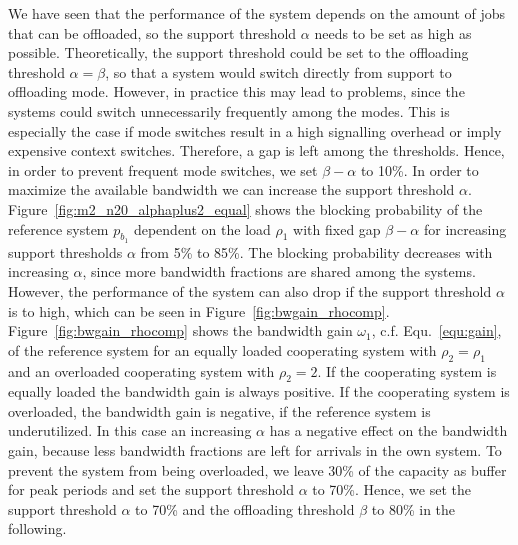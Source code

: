 We have seen that the performance of the system depends on the amount of jobs that can be offloaded, so the support threshold $\alpha$ needs to be set as high as possible. Theoretically, the support threshold could be set to the offloading threshold $\alpha=\beta$, so that a system would switch directly from support to offloading mode. However, in practice this may lead to problems, since the systems could switch unnecessarily frequently among the modes. This is especially the case if mode switches result in a high signalling overhead or imply expensive context switches. Therefore, a gap is left among the thresholds.
Hence, in order to prevent frequent mode switches, we set $\beta - \alpha$ to 10\%. In order to maximize the available bandwidth we can increase the support threshold $\alpha$.
Figure~\ref{fig:m2_n20_alphaplus2_equal} shows the blocking probability of the reference system $p_{b_1}$ dependent on the load $\rho_1$ with fixed gap $\beta-\alpha$ for increasing support thresholds $\alpha$ from 5\% to 85\%. The blocking probability decreases with increasing $\alpha$, since more bandwidth fractions are shared among the systems.
However, the performance of the system can also drop if the support threshold $\alpha$ is to high, which can be seen in Figure~\ref{fig:bwgain_rhocomp}. Figure~\ref{fig:bwgain_rhocomp} shows the bandwidth gain $\omega_1$, c.f. Equ.~\ref{equ:gain}, of the reference system for an equally loaded cooperating system with $\rho_2=\rho_1$ and an overloaded cooperating system with $\rho_2=2$. If the cooperating system is equally loaded the bandwidth gain is always positive. If the cooperating system is overloaded, the bandwidth gain is negative, if the reference system is underutilized. In this case an increasing $\alpha$ has a negative effect on the bandwidth gain, because less bandwidth fractions are left for arrivals in the own system.
To prevent the system from being overloaded, we leave 30\% of the capacity as buffer for peak periods and set the support threshold $\alpha$ to 70\%.
Hence, we set the support threshold $\alpha$ to 70\% and the offloading threshold $\beta$ to 80\% in the following.

